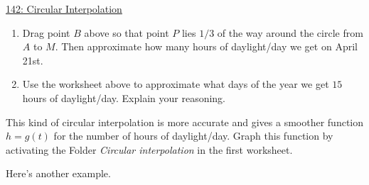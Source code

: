 \documentclass{ximera}
\begin{document}
\begin{example}
\href{https://www.desmos.com/calculator/nfsifbppzz}{142: Circular Interpolation}

\begin{enumerate}
\item Drag point $B$ above so that point $P$ lies $1/3$ of the way around the circle from $A$ to $M$. Then approximate how many hours of daylight/day we get on April 21st.
\begin{freeResponse} 
\end{freeResponse}

\item Use the worksheet above to approximate what days of the year we get $15$ hours of daylight/day. Explain your reasoning.
\begin{freeResponse}
\end{freeResponse}
\end{enumerate}

This kind of circular interpolation is more accurate and gives a smoother function $h=g(t)$ for the number of hours of daylight/day. Graph this function by activating the Folder \emph{Circular interpolation} in the first worksheet.

\end{example}


Here's another example.
\end{document}
